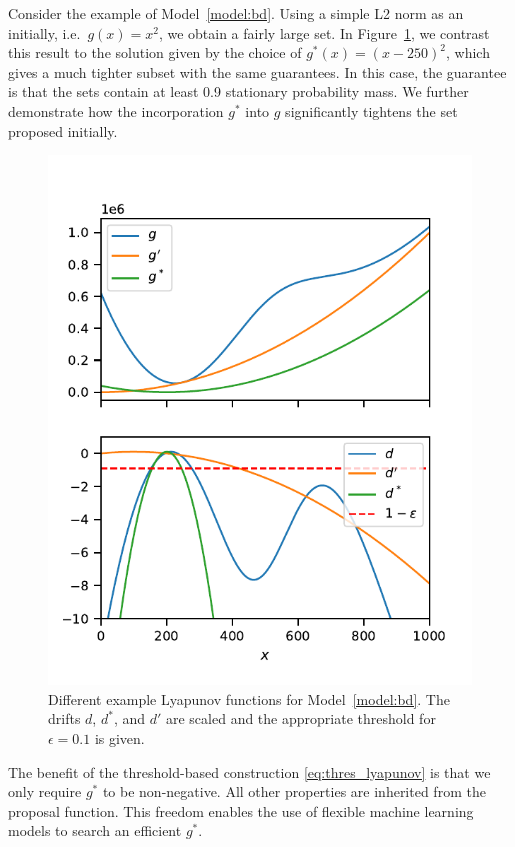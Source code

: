 \begin{example}
Consider the example of Model~\ref{model:bd}.
Using a simple L2 norm as an initially, i.e.\ $g(x) = x^2$, we obtain a fairly large set.
In Figure~\ref{fig:bd:truncation}, we contrast this result to the solution given by the choice of $g^*(x)=(x - 250)^2$, which gives a much tighter subset with the same guarantees.
In this case, the guarantee is that the sets contain at least 0.9 stationary probability mass.
We further demonstrate how the incorporation $g^*$ into $g$ significantly tightens the set proposed initially.
\begin{figure}[htb]
    \centering
    \includegraphics[width=.6\textwidth]{gfx/lyapunov_bd.pdf}
    \caption[Augmented Foster-Lyapunov function]{\label{fig:bd:truncation}Different example Lyapunov functions for Model~\ref{model:bd}. The drifts $d$, $d^*$, and $d'$ are scaled and the appropriate threshold for $\epsilon=0.1$ is given.}
\end{figure}
\end{example}


The benefit of the threshold-based construction \eqref{eq:thres_lyapunov} is that we only require $g^*$ to be non-negative.
All other properties are inherited from the proposal function.
This freedom enables the use of flexible machine learning models to search an efficient $g^*$.

